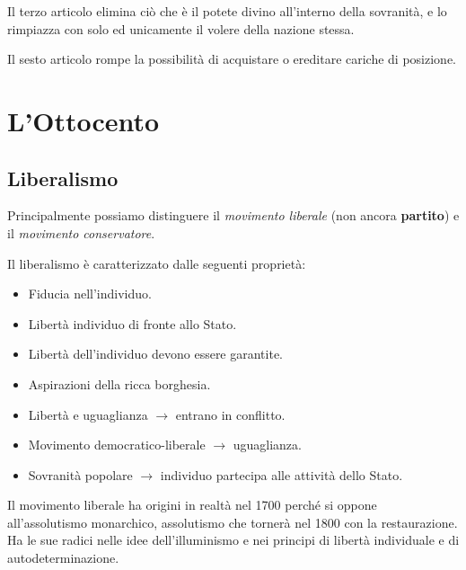 \documentclass[a4paper]{article}
\begin{document}
Il terzo articolo elimina ciò che è il potete divino all'interno della sovranità,
e lo rimpiazza con solo ed unicamente il volere della nazione stessa.

Il sesto articolo rompe la possibilità di acquistare o ereditare cariche di posizione.


\section{L'Ottocento}



\subsection{Liberalismo}

Principalmente possiamo distinguere il \textit{movimento liberale} (non ancora \textbf{partito})
e il \textit{movimento conservatore}.

Il liberalismo è caratterizzato dalle seguenti proprietà:
\begin{itemize}
    \item Fiducia nell'individuo.
    \item Libertà individuo di fronte allo Stato.
    \item Libertà dell'individuo devono essere garantite.
    \item Aspirazioni della ricca borghesia.
    \item Libertà e uguaglianza \(\rightarrow\) entrano in conflitto.
    \item Movimento democratico-liberale \(\rightarrow\) uguaglianza.
    \item Sovranità popolare \(\rightarrow\) individuo partecipa alle attività dello Stato.
\end{itemize}

Il movimento liberale ha origini in realtà nel 1700 perché si oppone
all'assolutismo monarchico, assolutismo che tornerà nel 1800 con la restaurazione.
Ha le sue radici nelle idee dell'illuminismo e nei principi di libertà individuale e di autodeterminazione.
\end{document}
